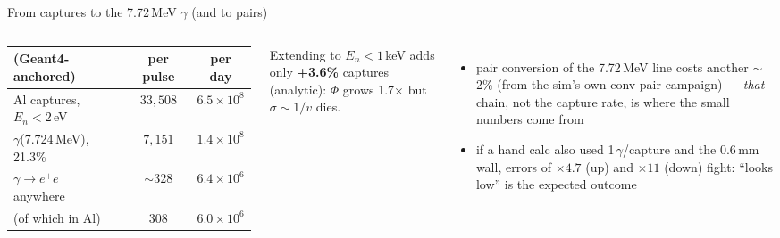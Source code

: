 \documentclass[aspectratio=169,11pt]{beamer}
\begin{document}
\begin{frame}{From captures to the 7.72\,MeV $\gamma$ (and to pairs)}
  \small
  \begin{columns}[T]
    \begin{tabular}{lcc}
      \toprule
      (Geant4-anchored) & per pulse & per day \\
      \midrule
      Al captures, $E_n\!<\!2$\,eV & $33{,}508$ & $6.5\times10^{8}$ \\
      $\gamma$(7.724\,MeV), 21.3\% & $7{,}151$ & $1.4\times10^{8}$ \\
      $\gamma\!\to\!e^{+}e^{-}$ anywhere & $\sim$328 & $6.4\times10^{6}$ \\
      \quad (of which in Al) & 308 & $6.0\times10^{6}$ \\
      \bottomrule
    \end{tabular}
    \smallskip

    Extending to $E_n<1$\,keV adds only \textbf{+3.6\%} captures
    (analytic): $\Phi$ grows 1.7$\times$ but $\sigma\!\sim\!1/v$ dies.
    \begin{itemize}
      \item pair conversion of the 7.72\,MeV line costs another
            $\sim$2\% (from the sim's own conv-pair campaign) ---
            \emph{that} chain, not the capture rate, is where the small
            numbers come from
      \item if a hand calc also used 1\,$\gamma$/capture and the 0.6\,mm
            wall, errors of $\times4.7$ (up) and $\times11$ (down) fight:
            ``looks low'' is the expected outcome
    \end{itemize}
  \end{columns}
\end{frame}
\end{document}
